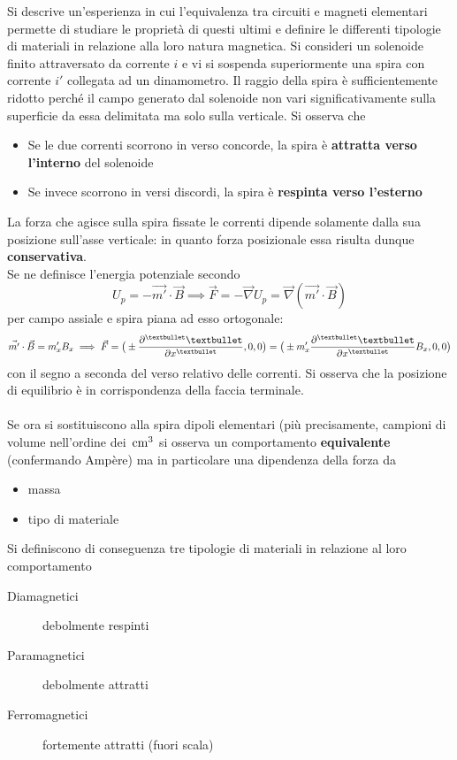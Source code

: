 Si descrive un'esperienza in cui l'equivalenza tra circuiti e magneti elementari permette di studiare le proprietà di questi ultimi e definire le differenti tipologie di materiali in relazione alla loro natura magnetica.
\linebreak
Si consideri un solenoide finito attraversato da corrente $i$ e vi si sospenda superiormente una spira con corrente $i'$ collegata ad un dinamometro. Il raggio della spira è sufficientemente ridotto perché il campo generato dal solenoide non vari significativamente sulla superficie da essa delimitata ma solo sulla verticale. Si osserva che
\begin{itemize}
\item Se le due correnti scorrono in verso concorde, la spira è \textbf{attratta verso l'interno} del solenoide
\item Se invece scorrono in versi discordi, la spira è \textbf{respinta verso l'esterno}
\end{itemize}
La forza che agisce sulla spira fissate le correnti dipende solamente dalla sua posizione sull'asse verticale: in quanto forza posizionale essa risulta dunque \textbf{conservativa}. 
\\Se ne definisce l'energia potenziale secondo
\[U_p = - \vec{m'} \cdot \vec{B} \implies \vec{F} = - \vec{\nabla} U_p = \vec{\nabla} (\vec{m'} \cdot \vec{B})\]
per campo assiale e spira piana ad esso ortogonale:
\[\vec{m'} \cdot \vec{B} = m_x' B_x \implies \vec{F} = \big(\pm \pdv[•]{•}{x}(m_x' B_x), 0, 0\big) = \big(\pm m_x' \pdv[•]{•}{x}B_x, 0, 0\big)\]
con il segno a seconda del verso relativo delle correnti. Si osserva che la posizione di equilibrio è in corrispondenza della faccia terminale.
\\~\\
Se ora si sostituiscono alla spira dipoli elementari (più precisamente, campioni di volume nell'ordine dei $\, \mathrm{c m^{3}}$ si osserva un comportamento \textbf{equivalente} (confermando Ampère) ma in particolare una dipendenza della forza da
\begin{itemize}
\item massa
\item tipo di materiale
\end{itemize}
Si definiscono di conseguenza tre tipologie di materiali in relazione al loro comportamento
\begin{description}
\item[Diamagnetici] debolmente respinti
\item[Paramagnetici] debolmente attratti
\item[Ferromagnetici] fortemente attratti (fuori scala)
\end{description}
